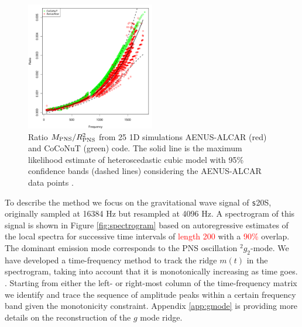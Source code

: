 \begin{figure}
 \centering
 \includegraphics[width=0.5\textwidth]{plots/model}
 \caption{Ratio $M_{\rm PNS}/R_{\rm PNS}^2$ from 25 1D simulations {\sc AENUS-ALCAR} (red) and {\sc CoCoNuT} (green) code. The solid line is the maximum likelihood estimate of heteroscedastic cubic model with 95\% confidence bands (dashed lines) considering  the  {\sc AENUS-ALCAR} data points .} \label{fig:LMVAR}
\end{figure}

To describe the method we focus on the gravitational wave signal
of {\texttt s20S}, originally
sampled at 16384 Hz but resampled at 4096 Hz.
A spectrogram of this signal is shown in Figure \ref{fig:spectrogram} based on
autoregressive estimates \pcd{[CITATION?]}of the local spectra for successive time intervals of 
\textcolor{red}{length 200} with a \textcolor{red}{ 90\%} overlap.
The dominant emission mode corresponds to the PNS oscillation $\mbox{}^2 g_2$-mode. We have
developed a time-frequency method to track the ridge $m(t)$ in the spectrogram,
taking into account that it is monotonically increasing as time goes. 
.
Starting from either the left- or right-most column of the time-frequency matrix
we identify and trace the sequence of amplitude peaks within a certain frequency
band given the monotonicity constraint. Appendix \ref{app:gmode} is providing more
details on the reconstruction of the $g$ mode ridge. 


